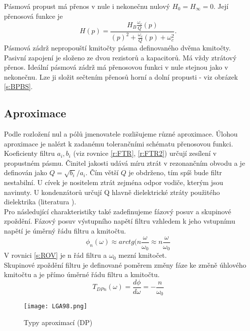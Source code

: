 \noindent Pásmová propust má přenos v nule i nekonečnu nulový $H_{0} = H_{\infty} = 0$. Její přenosová funkce je
\begin{equation}
H(p) = \frac{H_{B} \frac{\omega _c}{Q} (p) }{(p)^2 + \frac{\omega _c}{Q}(p) + \omega _c ^2}.
\end{equation}
Pásmová zádrž nepropouští kmitočty pásma definovaného dvěma kmitočty. Pasivní zapojení je složeno ze dvou rezistorů a kapacitorů. Má vždy ztrátový přenos. Ideální pásmová zádrž má přenosovou funkci v nule stejnou jako v nekonečnu. Lze ji složit sečtením přenosů horní a dolní propusti - viz obrázek \ref{s:BPBS}. \\
\subsection{Aproximace}
Podle rozložení nul a pólů jmenovatele rozlišujeme různé aproximace. Úlohou aproximace je nalézt k zadanému tolerančními schématu přenosovou funkci. Koeficienty filtru $a_i, b_i$ (viz rovnice \ref{r:FTR}, \ref{r:FTR2}) určují zesílení v propustném pásmu. Činitel jakosti udává míru ztrát v rezonančním obvodu a je definován jako $Q = \sqrt{b_i}/a_i$. Čím větší $Q$ je obdrženo, tím spíš bude filtr nestabilní. U cívek je nositelem ztrát zejména odpor vodiče, kterým jsou navinuty. U kondenzátorů určují Q hlavně dielektrické ztráty použitého dielektrika (literatura \cite{6}).\\
Pro následující charakteristiky také zadefinujeme fázový posuv a skupinové zpoždění. Fázový posuv výstupního napětí filtru vzhledem k jeho vstupnímu napětí je úměrný řádu filtru a kmitočtu.
\begin{equation}
\phi _n(\omega) \approx arctg(n \frac{\omega}{\omega _0} \approx n \frac{\omega}{\omega _0} \label{s:ROV}
\end{equation}
V rovnici \ref{s:ROV} je n řád filtru a $\omega _0$ mezní kmitočet.\\
Skupinové zpoždění filtru je definované poměrem změny fáze ke změně úhlového kmitočtu a je přímo úměrné řádu filtru a kmitočtu.\\
\begin{equation}
T _{DPn}(\omega) = \frac{d\phi}{d\omega} = - \frac{n}{\omega _0}
\end{equation}
\begin{figure}[h]
\centering
\texttt{[image: LGA98.png]}
\caption[Typy aproximací (DP)]{Typy aproximací (DP)\cite{9}}
\end{figure}
